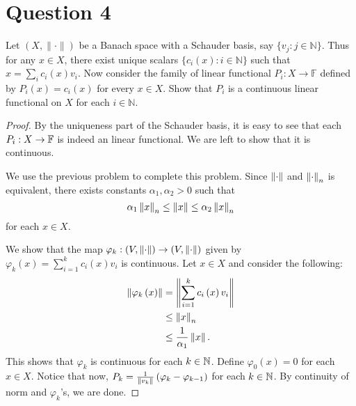 \section{Question 4}
\horz

Let $(X,\|\cdot\|)$ be a Banach space with a Schauder basis, say $\{v_j: j\in\mathbb N\}.$ Thus for any $x\in X$, there exist  unique scalars $\{c_i(x): i\in\mathbb N\}$ such that $x= \sum_i c_i(x) v_i.$ Now consider the family of linear functional $P_i : X \to \mathbb F$ defined by $P_i(x) = c_i(x)$ for every $x\in X.$ Show that  $P_i$ is a continuous linear functional on $X$ for each $i\in \mathbb N.$

\horz

\begin{proof}
    By the uniqueness part of the Schauder basis, it is easy to see that each $P_{i} : X \to \mathbb F$ is indeed an linear functional. We are left to show that it is continuous. 

    We use the previous problem to complete this problem. Since $\left\lVert \cdot \right\rVert$ and $\left\lVert \cdot \right\rVert_{n}$ is equivalent, there exists constants $\alpha_1 , \alpha_2 > 0$ such that 
    \begin{equation*}
	\alpha_{1} \left\lVert x \right\rVert_{n} \le \left\lVert x \right\rVert \le \alpha_{2} \left\lVert x \right\rVert_{n}
    \end{equation*}
    for each $x\in X$.


    We show that the map $\varphi_{k} : \left( V, \left\lVert \cdot \right\rVert \right) \to \left( V, \left\lVert \cdot \right\rVert \right)$ given by $\varphi _{k} \left( x \right) = \sum_{i=1}^{k} c_{i} \left( x \right) v_{i}$ is continuous. Let $x \in X$ and consider the following:
    \begin{align*}
	\left\lVert \varphi_{k} \left( x \right) \right\rVert &= \left\lVert \sum_{i=1}^{k} c_{i} \left( x \right) v_{i} \right\rVert \\
	&\le \left\lVert x \right\rVert_{n} \\
	&\le \frac{1}{\alpha_{1}} \left\lVert x \right\rVert.
    \end{align*}
    This shows that $\varphi_{k}$ is continuous for each $k\in \mathbb N$. Define $\varphi_{0} (x)=0$ for each $x\in X$. Notice that now, $P_{k} = \frac{1}{\left\lVert v_{k} \right\rVert} \left( \varphi_{k} - \varphi_{k-1} \right)$ for each $k\in \mathbb N$. By continuity of norm and $\varphi_{k}$'s, we are done.
\end{proof}
